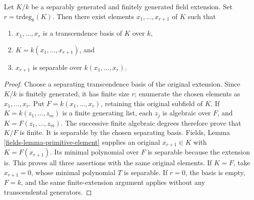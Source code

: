 \begin{lemma}
\label{editorial-source-lemma-generating-finitely-generated-separable-field-extensions}
Let $K/k$ be a separably generated and finitely generated
field extension.
Set $r = \text{trdeg}_k(K)$. Then there exist elements
$x_1, \ldots, x_{r + 1}$ of $K$ such that
\begin{enumerate}
\item $x_1, \ldots, x_r$ is a transcendence basis of $K$ over $k$,
\item $K = k(x_1, \ldots, x_{r + 1})$, and
\item $x_{r + 1}$ is separable over $k(x_1, \ldots, x_r)$.
\end{enumerate}
\end{lemma}

\begin{proof}
Choose a separating transcendence basis of the
original extension. Since $K/k$ is finitely
generated, it has finite size $r$; enumerate
the chosen elements as $x_1,\ldots,x_r$.
Put $F=k(x_1,\ldots,x_r)$, retaining this
original subfield of $K$. If
$K=k(z_1,\ldots,z_m)$ is a finite generating
list, each $z_j$ is algebraic over $F$,
and $K=F(z_1,\ldots,z_m)$. The successive
finite algebraic degrees therefore prove
that $K/F$ is finite. It is separable by
the chosen separating basis. Fields,
Lemma \ref{fields-lemma-primitive-element}
supplies an original $x_{r+1}\in K$ with
$K=F(x_{r+1})$. Its minimal polynomial over
$F$ is separable because the extension is.
This proves all three assertions with the
same original elements. If $K=F$, take
$x_{r+1}=0$, whose minimal polynomial $T$
is separable. If $r=0$, the basis is empty,
$F=k$, and the same finite-extension
argument applies without any transcendental
generators.
\end{proof}